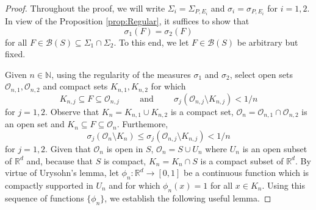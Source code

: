 \documentclass[11pt]{article}
\begin{document}
\begin{proof}
Throughout the proof, we will write $\Sigma_i=\Sigma_{P,E_i}$ and $\sigma_i=\sigma_{P,E_i}$ for $i=1,2$. In view of the Proposition \ref{prop:Regular}, it suffices to show that 
\begin{equation*}
\sigma_1(F)=\sigma_2(F)
\end{equation*}
for all $F\in \mathcal{B}(S)\subseteq \Sigma_{1}\cap\Sigma_{2}$. To this end, we let $F\in\mathcal{B}(S)$ be arbitrary but fixed. 

Given $n\in\mathbb{N}$, using the regularity of the measures $\sigma_1$ and $\sigma_2$, select open sets $\mathcal{O}_{n,1},\mathcal{O}_{n,2}$ and compact sets $K_{n,1},K_{n,2}$ for which
\begin{equation*}
K_{n,j}\subseteq F\subseteq \mathcal{O}_{n,j}\hspace{1cm}\mbox{and}\hspace{1cm}\sigma_j(\mathcal{O}_{n,j}\setminus K_{n,j})<1/n
\end{equation*}
for $j=1,2$. Observe that $K_n=K_{n,1}\cup K_{n,2}$ is a compact set, $\mathcal{O}_n=\mathcal{O}_{n,1}\cap\mathcal{O}_{n,2}$ is an open set and $K_n\subseteq F\subseteq \mathcal{O}_n$. Furthemore, 
\begin{equation*}
\sigma_j(\mathcal{O}_n\setminus K_n)\leq \sigma_j(\mathcal{O}_{n,j}\setminus K_{n,j})<1/n
\end{equation*}
for $j=1,2$. Given that $\mathcal{O}_n$ is open in $S$, $\mathcal{O}_n=S\cup U_n$ where $U_n$ is an open subset of $\mathbb{R}^d$ and, because that $S$ is compact, $K_n=K_n\cap S$ is a compact subset of $\mathbb{R}^d$. By virtue of Urysohn's lemma, let $\phi_n:\mathbb{R}^d\to [0,1]$ be a continuous function which is compactly supported in $U_n$ and for which $\phi_n(x)=1$ for all $x\in K_n$. Using this sequence of functions $\{\phi_n\}$, we establish the following useful lemma.


\end{proof}
\end{document}
